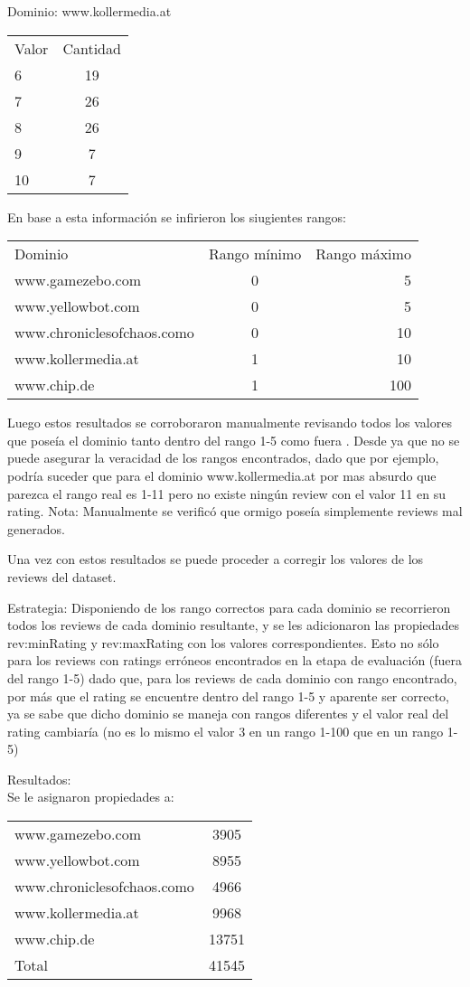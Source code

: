 Dominio: www.kollermedia.at\\
\begin{tabular}{| l | c |}
 Valor & Cantidad\\
 6 & 19\\
 7 & 26\\
 8 & 26\\
 9 & 7\\
 10 & 7\\
\end{tabular}
 
En base a esta información se infirieron los siugientes rangos:

\begin{tabular}{| l | c | r | }
 Dominio & Rango mínimo & Rango máximo \\
 www.gamezebo.com & 0 & 5 \\
 www.yellowbot.com & 0 & 5 \\
 www.chroniclesofchaos.como & 0 & 10 \\
 www.kollermedia.at & 1 & 10 \\
 www.chip.de & 1 & 100 
\end{tabular}

Luego estos resultados se corroboraron manualmente revisando todos los valores que poseía el dominio tanto dentro del rango 1-5 como fuera .
Desde ya que no se puede asegurar la veracidad de los rangos encontrados, dado que por ejemplo, podría suceder que para el dominio 
www.kollermedia.at por mas absurdo que parezca el rango real es 1-11 pero no existe ningún review con el valor 11 en su rating.
Nota: Manualmente se verificó que ormigo poseía simplemente reviews mal generados.

Una vez con estos resultados se puede proceder a corregir los valores de los reviews del dataset.

Estrategia:
Disponiendo de los rango correctos para cada dominio se recorrieron todos los reviews de cada dominio resultante, y se les adicionaron 
las propiedades rev:minRating y rev:maxRating con los valores correspondientes.
Esto no sólo para los reviews con ratings erróneos encontrados en la etapa de evaluación (fuera del rango 1-5) dado que, para los reviews de 
cada dominio con rango encontrado, por más que el rating se encuentre dentro del rango 1-5 y aparente ser correcto,  ya se sabe que dicho dominio se 
maneja con rangos diferentes y el valor real del rating cambiaría (no es lo mismo el valor 3 en un rango 1-100 que en un rango 1-5)

Resultados:\\
Se le asignaron propiedades a:\\
\begin{tabular}{| l | c |}
 www.gamezebo.com & 3905\\
 www.yellowbot.com & 8955\\
 www.chroniclesofchaos.como & 4966\\
 www.kollermedia.at & 9968\\
 www.chip.de & 13751\\
 Total & 41545
\end{tabular}\\
\\

